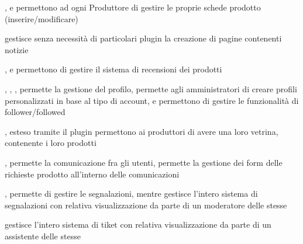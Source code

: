
{, }
{ e  permettono ad ogni Produttore di gestire le proprie schede prodotto (inserire/modificare)}


{}
{ gestisce senza necessità di particolari plugin la creazione di pagine contenenti notizie}


{, }
{ e  permettono di gestire il sistema di recensioni dei prodotti}


{, , , }
{ permette la gestione del profilo,  permette agli amministratori di creare profili personalizzati in base al tipo di account,  e  permettono di gestire le funzionalità di follower/followed}


{, }
{ esteso tramite il plugin  permettono ai produttori di avere una loro vetrina, contenente i loro prodotti}


{, }
{ permette la comunicazione fra gli utenti,  permette la gestione dei form delle richieste prodotto all'interno delle comunicazioni}



{, }
{ permette di gestire le segnalazioni, mentre  gestisce l'intero sistema di segnalazioni con relativa visualizzazione da parte di un moderatore delle stesse}


{}
{ gestisce l'intero sistema di tiket con relativa visualizzazione da parte di un assistente delle stesse}


